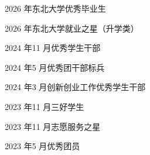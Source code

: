\documentclass[a4paper]{article}
\newcommand{\bodyfont}{\fontsize{9.96}{12}\selectfont\color{bodygray}}
\newcommand{\cvsection}[2][0pt]{%
  \par\vspace{2.6pt}\noindent
  \hspace{#1}{\songti\bfseries\fontsize{11.04}{12}\selectfont\color{headpurple}#2}%
  \par\nointerlineskip\vspace{0.5pt}%
  \noindent\hspace{5pt}\smash{\textcolor{rulepurple}{\rule{525pt}{1.05pt}}}%
  \par\nointerlineskip\vspace{2.2pt}}
\begin{document}
\cvsection[5.2pt]{其他}
\bodyfont
\begin{minipage}[t]{0.591\textwidth}
2026 年东北大学优秀毕业生
\end{minipage}%
\begin{minipage}[t]{0.409\textwidth}
2026 年东北大学就业之星（升学类）
\end{minipage}

\vspace{0.7pt}
\begin{minipage}[t]{0.591\textwidth}
2024 年11 月优秀学生干部
\end{minipage}%
\begin{minipage}[t]{0.409\textwidth}
2024 年5 月优秀团干部标兵
\end{minipage}

\begin{minipage}[t]{0.591\textwidth}
2024 年3 月创新创业工作优秀学生干部
\end{minipage}%
\begin{minipage}[t]{0.409\textwidth}
2023 年11 月三好学生
\end{minipage}

\begin{minipage}[t]{0.591\textwidth}
2023 年11 月志愿服务之星
\end{minipage}%
\begin{minipage}[t]{0.409\textwidth}
2023 年5 月优秀团员
\end{minipage}
\end{document}
